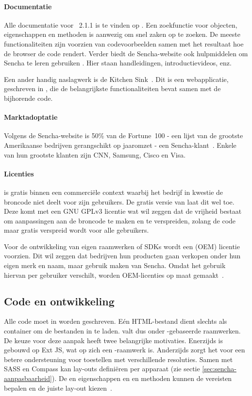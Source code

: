 \paragraph{Documentatie}
Alle documentatie voor \st{}~2.1.1 is te vinden op .  
Een zoekfunctie voor objecten,  eigenschappen en methoden is aanwezig om snel zaken op te zoeken.  
De meeste functionaliteiten zijn voorzien van codevoorbeelden samen met het resultaat hoe de browser de code rendert.  
Verder biedt de Sencha-website ook hulpmiddelen om Sencha te leren gebruiken .  
Hier staan handleidingen, introductievideos, enz.

Een ander handig naslagwerk is de Kitchen Sink~\cite{Inc.2013}.  
Dit is een webapplicatie,  geschreven in \st{},  die de belangrijkste functionaliteiten bevat samen met de bijhorende code.  

\paragraph{Marktadoptatie}
Volgens de Sencha-website is 50\% van de Fortune~100 - een lijst van de grootste Amerikaanse bedrijven gerangschikt op jaaromzet - een Sencha-klant~\cite{Inc.}.  
Enkele van hun grootste klanten zijn CNN,  Samsung,  Cisco en  Visa.

\paragraph{Licenties}
\st{} is gratis binnen een commerciële context waarbij het bedrijf in kwestie de broncode niet deelt voor zijn gebruikers.  
De gratis  versie van \st{} laat dit wel toe.  
Deze komt met een GNU GPLv3  licentie wat wil zeggen dat de vrijheid bestaat om aanpassingen aan de broncode te maken en te verspreiden,  zolang de code maar gratis verspreid wordt voor alle gebruikers.
  
Voor de ontwikkeling van eigen raamwerken of SDKs wordt een  (OEM) licentie voorzien.  
Dit wil zeggen dat bedrijven hun producten gaan verkopen onder hun eigen merk en naam, maar gebruik maken van Sencha.  
Omdat het gebruik hiervan per gebruiker verschilt,  worden OEM-licenties op maat gemaakt~\cite{Inc.}.

\subsection{Code en ontwikkeling}
Alle code moet in \js{} worden geschreven.
Eén HTML-bestand dient slechts als container om de bestanden in te laden.  
\st{} valt dus onder \js{}-gebaseerde raamwerken.  
De keuze voor deze aanpak heeft twee belangrijke motivaties.  
Enerzijds is \st{} gebouwd op Ext JS,  wat op zich een \js{}-raamwerk is.  
Anderzijds zorgt het voor een betere ondersteuning voor toestellen met verschillende resoluties.  
Samen met SASS en Compass kan \st{} lay-outs definiëren per apparaat (zie sectie \ref{sec:sencha-aanpasbaarheid}).  
De  en  eigenschappen en  en  methoden kunnen de vereisten bepalen en de juiste lay-out kiezen~\cite{JohnEClark2012}.

